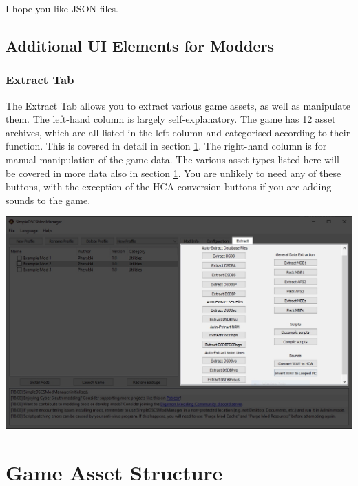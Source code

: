 \documentclass{article}
\begin{document}
I hope you like JSON files.

\subsection{Additional UI Elements for Modders}
\subsubsection{Extract Tab}
The Extract Tab allows you to extract various game assets, as well as manipulate them.
The left-hand column is largely self-explanatory. The game has 12 asset archives, which are all listed in the left column and categorised according to their function. This is covered in detail in section \ref{Section:GameAssets}. The right-hand column is for manual manipulation of the game data. The various asset types listed here will be covered in more data also in section \ref{Section:GameAssets}. You are unlikely to need any of these buttons, with the exception of the HCA conversion buttons if you are adding sounds to the game.
\begin{center}
  \includegraphics[scale=0.4]{img/modmanager_ui_extracttab.jpg}
\end{center}
\newpage

\section{Game Asset Structure}\label{Section:GameAssets}
\end{document}
